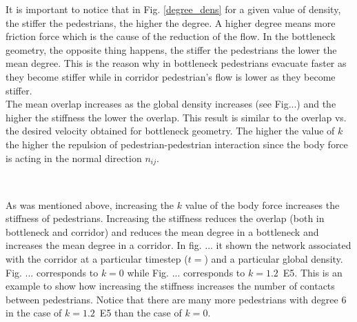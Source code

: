 \documentclass[preprint,12pt]{elsarticle}
\begin{document}
It is important to notice that in Fig. \ref{degree_dens} for a given value of density, the stiffer the pedestrians, the higher the degree. A higher degree means more friction force which is the cause of the reduction of the flow. In the bottleneck geometry, the opposite thing happens, the stiffer the pedestrians the lower the mean degree. This is the reason why in bottleneck pedestrians evacuate faster as they become stiffer while in corridor pedestrian's flow is lower as they become stiffer.\\

The mean overlap increases as the global density increases (see Fig...) and the higher the stiffness the lower the overlap. This result is similar to the overlap vs. the desired velocity obtained for bottleneck geometry. The higher the value of $k$ the higher the repulsion of pedestrian-pedestrian interaction since the body force is acting in the normal direction $n_{ij}$.\\

\begin{figure}[!htbp]
\centering
    \ 
    \\
\caption[width=0.47\columnwidth]{}
\label{network_corridor}
\end{figure}

As was mentioned above, increasing the $k$ value of the body force increases the stiffness of pedestrians. Increasing the stiffness reduces the overlap (both in bottleneck and corridor) and reduces the mean degree in a bottleneck and increases the mean degree in a corridor. In fig. ... it shown the network associated with the corridor at a particular timestep ($t=$) and a particular global density. Fig. ... corresponds to $k=0$ while Fig. ... corresponds to $k=1.2$~E5. This is an example to show how increasing the stiffness increases the number of contacts between pedestrians. Notice that there are many more pedestrians with degree 6 in the case of $k=1.2$~E5 than the case of $k=0$. \\
\end{document}
